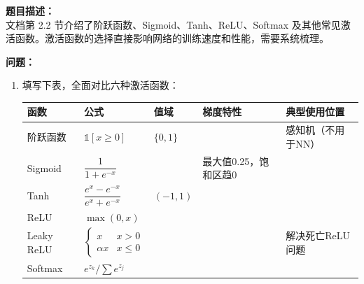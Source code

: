 \documentclass[a4paper,11pt]{ctexart}
\begin{document}
\begin{problembox}
    \textbf{题目描述：}\\
    文档第 2.2 节介绍了阶跃函数、Sigmoid、Tanh、ReLU、Softmax 及其他常见激活函数。激活函数的选择直接影响网络的训练速度和性能，需要系统梳理。

    \vspace{0.3cm}
    \textbf{问题：}
    \begin{enumerate}[(1)]
        \item 填写下表，全面对比六种激活函数：

        \begin{center}
        \begin{tabular}{p{1.8cm} p{3.2cm} p{1.5cm} p{2.0cm} p{3.0cm}}
            \toprule
            函数 & 公式 & 值域 & 梯度特性 & 典型使用位置 \\
            \midrule
            阶跃函数 & $\mathbb{1}[x \geq 0]$ & $\{0,1\}$ & \underline{\hspace{1.5cm}} & 感知机（不用于NN） \\[1.2em]
            Sigmoid & $\dfrac{1}{1+e^{-x}}$ & \underline{\hspace{1.5cm}} & 最大值0.25，饱和区趋0 & \underline{\hspace{2.5cm}} \\[1.5em]
            Tanh & $\dfrac{e^x-e^{-x}}{e^x+e^{-x}}$ & $(-1,1)$ & \underline{\hspace{1.5cm}} & \underline{\hspace{2.5cm}} \\[1.5em]
            ReLU & $\max(0,x)$ & \underline{\hspace{1.5cm}} & \underline{\hspace{1.5cm}} & \underline{\hspace{2.5cm}} \\[1.2em]
            Leaky ReLU & $\begin{cases}x & x>0\\ \alpha x & x\leq0\end{cases}$ & \underline{\hspace{1.5cm}} & \underline{\hspace{1.5cm}} & 解决死亡ReLU问题 \\[1.5em]
            Softmax & $e^{z_k}/\sum e^{z_j}$ & \underline{\hspace{1.5cm}} & \underline{\hspace{1.5cm}} & \underline{\hspace{2.5cm}} \\
            \bottomrule
        \end{tabular}
        \end{center}


\end{enumerate}
\end{problembox}
\end{document}
